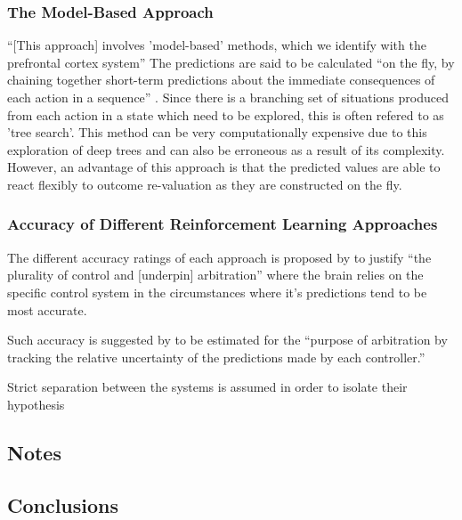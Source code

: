 \documentclass[10pt]{article}
\begin{document}
	\subsubsection{The Model-Based Approach}

		``[This approach] involves 'model-based' methods, which we identify with the prefrontal cortex system'' \parencite{Daw} The predictions are said to be calculated ``on the fly, by chaining together short-term predictions about the immediate consequences of each action in a sequence'' \parencite{Daw}. Since there is a branching set of situations produced from each action in a state which need to be explored, this is often refered to as 'tree search'. 
		This method can be very computationally expensive due to this exploration of deep trees and can also be erroneous as a result of its complexity. 
		However, an advantage of this approach is that the predicted values are able to react flexibly to outcome re-valuation as they are constructed on the fly.

	\subsubsection{Accuracy of Different Reinforcement Learning Approaches}

		The different accuracy ratings of each approach is proposed by \textcite{Daw} to justify ``the plurality of control and [underpin] arbitration'' where the brain relies on the specific control system in the circumstances where it's predictions tend to be most accurate.

		Such accuracy is suggested by \textcite{Daw} to be estimated for the ``purpose of arbitration by tracking the relative uncertainty of the predictions made by each controller.''

		Strict separation between the systems is assumed in order to isolate their hypothesis





\subsection{Notes}

\subsection{Conclusions}

\printbibliography
\end{document}
